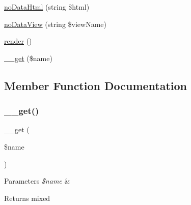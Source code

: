 \begin{DoxyCompactItemize}
\item 
\hyperlink{classhamburgscleanest_1_1_data_tables_1_1_models_1_1_data_table_a82b20d38c42a9e462cdfe91b77b805a7}{no\+Data\+Html} (string \$html)
\item 
\hyperlink{classhamburgscleanest_1_1_data_tables_1_1_models_1_1_data_table_a3983a155c93b691cd1e069a3e46baaf6}{no\+Data\+View} (string \$view\+Name)
\item 
\hyperlink{classhamburgscleanest_1_1_data_tables_1_1_models_1_1_data_table_afde88292c44dc59faf017738dae6dffb}{render} ()
\item 
\hyperlink{classhamburgscleanest_1_1_data_tables_1_1_models_1_1_data_table_abc8e9e31bb15c8a44c3210ec551407c8}{\+\_\+\+\_\+get} (\$name)
\end{DoxyCompactItemize}


\subsection{Member Function Documentation}
\mbox{\label{classhamburgscleanest_1_1_data_tables_1_1_models_1_1_data_table_abc8e9e31bb15c8a44c3210ec551407c8}} 
\subsubsection{\texorpdfstring{\+\_\+\+\_\+get()}{\_\_get()}}
{\footnotesize\ttfamily \+\_\+\+\_\+get (\begin{DoxyParamCaption}\item[{}]{\$name }\end{DoxyParamCaption})}


\begin{DoxyParams}{Parameters}
{\em \$name} & \\
\hline
\end{DoxyParams}
\begin{DoxyReturn}{Returns}
mixed 
\end{DoxyReturn}
\mbox{\label{classhamburgscleanest_1_1_data_tables_1_1_models_1_1_data_table_a267226c73f5cd89ec9f01776aab256c5}} 
